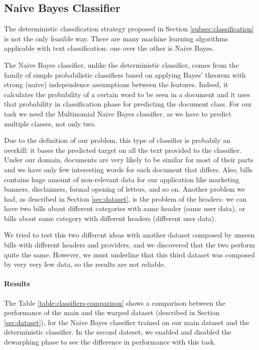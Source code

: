 \documentclass[10pt,twocolumn,letterpaper]{article}
\begin{document}
\subsection{Naive Bayes Classifier}
\label{subsec:naive-bayes-classifier}

The deterministic classification strategy proposed in Section
\ref{subsec:classification} is not the only feasible way. There are
many machine learning algorithms applicable with text classification:
one over the other is Naive Bayes.

The Naive Bayes classifier, unlike the deterministic classifier, comes
from the family of simple probabilistic classifiers based on applying
Bayes' theorem with strong (naive) independence assumptions between
the features. Indeed, it calculates the probability of a certain word
to be seen in a document and it uses that probability in
classification phase for predicting the document class. For our task
we need the Multinomial Naive Bayes classifier, as we have to predict
multiple classes, not only two.

Due to the definition of our problem, this type of classifier
is probabily an overkill: it bases the predicted target on all the
text provided to the classifier. Under our domain, documents are very
likely to be similar for most of their parts and we have only few
interesting words for each document that differs. Also, bills contains
huge amount of non-relevant data for our application like marketing
banners, disclaimers, formal opening of letters, and so on. Another
problem we had, as described in Section \ref{sec:dataset}, is the
problem of the headers: we can have two bills about different
categories with same header (same user data), or bills about same
category with different headers (different user data).

We tried to test this two different ideas with another dataset
composed by unseen bills with different headers and providers, and we
discovered that the two perform quite the same. However, we must
underline that this third dataset was composed by very very few data,
so the results are not reliable.

\paragraph{Results}

The Table \ref{table:classifiers-comparison} shows a comparison
between the performance of the main and the warped dataset (described
in Section \ref{sec:dataset}), for the Naive Bayes classifier trained
on our main dataset and the deterministic classifier. In the second
dateset, we enabled and disabled the dewarphing phase to see the
difference in performance with this task.
\end{document}
